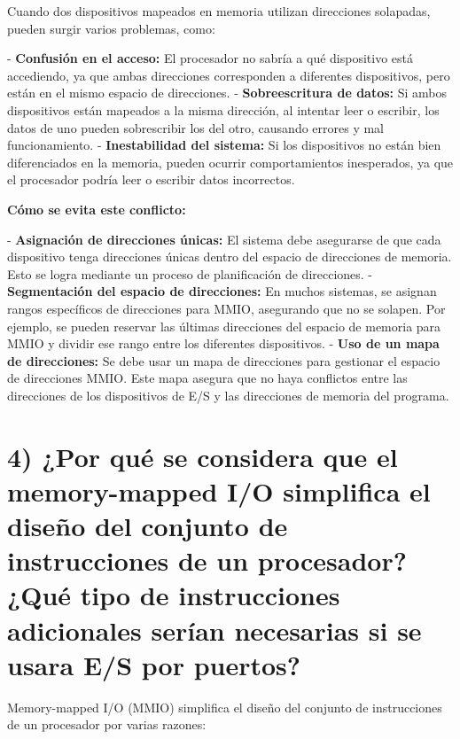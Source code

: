 \documentclass[12pt]{article}
\begin{document}
Cuando dos dispositivos mapeados en memoria utilizan direcciones solapadas, pueden surgir varios problemas, como:

- \textbf{Confusión en el acceso:} El procesador no sabría a qué dispositivo está accediendo, ya que ambas direcciones corresponden a diferentes dispositivos, pero están en el mismo espacio de direcciones.
- \textbf{Sobreescritura de datos:} Si ambos dispositivos están mapeados a la misma dirección, al intentar leer o escribir, los datos de uno pueden sobrescribir los del otro, causando errores y mal funcionamiento.
- \textbf{Inestabilidad del sistema:} Si los dispositivos no están bien diferenciados en la memoria, pueden ocurrir comportamientos inesperados, ya que el procesador podría leer o escribir datos incorrectos.

\textbf{Cómo se evita este conflicto:}

- \textbf{Asignación de direcciones únicas:} El sistema debe asegurarse de que cada dispositivo tenga direcciones únicas dentro del espacio de direcciones de memoria. Esto se logra mediante un proceso de planificación de direcciones.
- \textbf{Segmentación del espacio de direcciones:} En muchos sistemas, se asignan rangos específicos de direcciones para MMIO, asegurando que no se solapen. Por ejemplo, se pueden reservar las últimas direcciones del espacio de memoria para MMIO y dividir ese rango entre los diferentes dispositivos.
- \textbf{Uso de un mapa de direcciones:} Se debe usar un mapa de direcciones para gestionar el espacio de direcciones MMIO. Este mapa asegura que no haya conflictos entre las direcciones de los dispositivos de E/S y las direcciones de memoria del programa.

\vspace{1cm}
\vspace{1cm}

\section*{4) ¿Por qué se considera que el memory-mapped I/O simplifica el diseño del conjunto de instrucciones de un procesador? ¿Qué tipo de instrucciones adicionales serían necesarias si se usara E/S por puertos?}

Memory-mapped I/O (MMIO) simplifica el diseño del conjunto de instrucciones de un procesador por varias razones:
\end{document}
